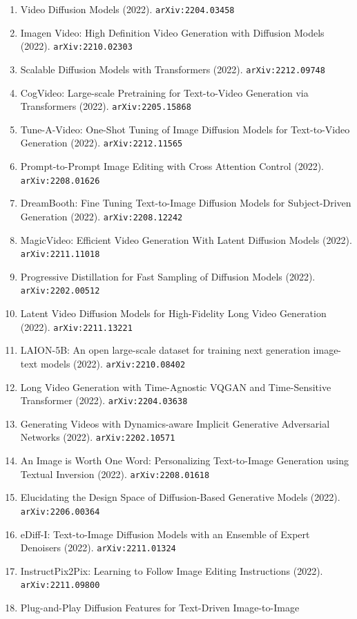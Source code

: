 \documentclass[11pt]{article}
\begin{document}
\begin{enumerate}
  \item Video Diffusion Models (2022). \texttt{arXiv:2204.03458}
  \item Imagen Video: High Definition Video Generation with Diffusion Models (2022). \texttt{arXiv:2210.02303}
  \item Scalable Diffusion Models with Transformers (2022). \texttt{arXiv:2212.09748}
  \item CogVideo: Large-scale Pretraining for Text-to-Video Generation via
  Transformers (2022). \texttt{arXiv:2205.15868}
  \item Tune-A-Video: One-Shot Tuning of Image Diffusion Models for
  Text-to-Video Generation (2022). \texttt{arXiv:2212.11565}
  \item Prompt-to-Prompt Image Editing with Cross Attention Control (2022). \texttt{arXiv:2208.01626}
  \item DreamBooth: Fine Tuning Text-to-Image Diffusion Models for
  Subject-Driven Generation (2022). \texttt{arXiv:2208.12242}
  \item MagicVideo: Efficient Video Generation With Latent Diffusion Models (2022). \texttt{arXiv:2211.11018}
  \item Progressive Distillation for Fast Sampling of Diffusion Models (2022). \texttt{arXiv:2202.00512}
  \item Latent Video Diffusion Models for High-Fidelity Long Video Generation (2022). \texttt{arXiv:2211.13221}
  \item LAION-5B: An open large-scale dataset for training next generation
  image-text models (2022). \texttt{arXiv:2210.08402}
  \item Long Video Generation with Time-Agnostic VQGAN and Time-Sensitive
  Transformer (2022). \texttt{arXiv:2204.03638}
  \item Generating Videos with Dynamics-aware Implicit Generative Adversarial
  Networks (2022). \texttt{arXiv:2202.10571}
  \item An Image is Worth One Word: Personalizing Text-to-Image Generation using
  Textual Inversion (2022). \texttt{arXiv:2208.01618}
  \item Elucidating the Design Space of Diffusion-Based Generative Models (2022). \texttt{arXiv:2206.00364}
  \item eDiff-I: Text-to-Image Diffusion Models with an Ensemble of Expert
  Denoisers (2022). \texttt{arXiv:2211.01324}
  \item InstructPix2Pix: Learning to Follow Image Editing Instructions (2022). \texttt{arXiv:2211.09800}
  \item Plug-and-Play Diffusion Features for Text-Driven Image-to-Image

\end{enumerate}
\end{document}
